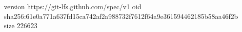 version https://git-lfs.github.com/spec/v1
oid sha256:61e0a771a637fd15ca742af2a988732f7612f64a9e361594462185b58aa46f2b
size 226623
